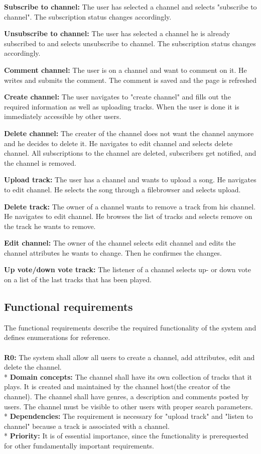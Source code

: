 \documentclass[a4paper,11pt,report]{article}
\begin{document}
{\textbf{Subscribe to channel:}
The user has selected a channel and selects "subscribe to channel". The subscription status changes accordingly.

\textbf{Unsubscribe to channel:}
The user has selected a channel he is already subscribed to and selects unsubscribe to channel. The subscription status changes accordingly.

\textbf{Comment channel:}
The user is on a channel and want to comment on it. He writes and submits the comment. The comment is saved and the page is refreshed

\textbf{Create channel:}
The user navigates to "create channel" and fills out the required information as well as uploading tracks. When the user is done it is immediately accessible by other users.

\textbf{Delete channel:}
The creater of the channel does not want the channel anymore and he decides to delete it. He navigates to edit channel and selects delete channel. All subscriptions to the channel are deleted, subscribers get notified, and the channel is removed.

\textbf{Upload track:}
The user has a channel and wants to upload a song. He navigates to edit channel. He selects the song through a filebrowser and selects upload.

\textbf{Delete track:}
The owner of a channel wants to remove a track from his channel. He navigates to edit channel. He browses the list of tracks and selects remove on the track he wants to remove.

\textbf{Edit channel:}
The owner of the channel selects edit channel and edits the channel attributes he wants to change. Then he confirmes the changes.

\textbf{Up vote/down vote track:}
The listener of a channel selects up- or down vote on a list of the last tracks that has been played.

\subsection{Functional requirements}
The functional requirements describe the required functionality of the system and defines enumerations for reference.
\\ \\
\textbf{R0:}
The system shall allow all users to create a channel, add attributes, edit and delete the channel. \\*
\textbf{Domain concepts:}
The channel shall have its own collection of tracks that it plays. It is created and maintained by the channel host(the creator of the channel).
The channel shall have genres, a description and comments posted by users.
The channel must be visible to other users with proper search parameters. \\*
\textbf{Dependencies:} 
The requirement is necessary for "upload track" and "listen to channel" because a track is associated with a channel. \\*
\textbf{Priority:} 
It is of essential importance, since the functionality is prerequested for other fundamentally important requirements.
\\ \\

}
\end{document}
